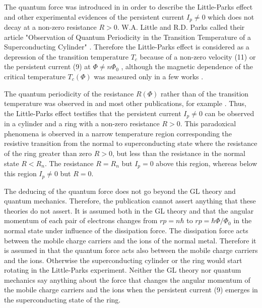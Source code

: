 \documentclass[twocolumn,secnumarabic,amssymb, nobibnotes, aps, prd]{revtex4}
\begin{document}
The quantum force was introduced in \cite{PRB2001} in order to describe the Little-Parks effect and other experimental evidences of the persistent current $I_{p} \neq 0$ which does not decay at a non-zero resistance $R > 0$. W.A. Little and R.D. Parks called their article "Observation of Quantum Periodicity in the Transition Temperature of a Superconducting Cylinder" \cite{LP1962}. Therefore the Little-Parks effect is considered as a depression of the transition temperature $T_{c}$ because of a non-zero velocity (11) or the persistent current (9) at $\Phi \neq n\Phi_{0}$ \cite{Tink75}, although the magnetic dependence of the critical temperature $T_{c}(\Phi)$ was measured only in a few works \cite{Moshchalkov1992}. 

The quantum periodicity of the resistance $R(\Phi)$ rather than of the transition temperature was observed in \cite{LP1962} and most other publications, for example \cite{Letter2007}. Thus, the Little-Parks effect testifies that the persistent current $I_{p} \neq 0$ can be observed in a cylinder \cite{LP1962} and a ring \cite{Letter2007} with a non-zero resistance $R > 0$. This paradoxical phenomena is observed in a narrow temperature region corresponding the resistive transition from the normal to superconducting state where the resistance of the ring greater than zero $R > 0$, but less than the resistance in the normal state $R < R_{n}$. The resistance $R = R_{n}$ but $I_{p} = 0$ above this region, whereas below this region $I_{p} \neq 0$ but $R = 0$. 

The deducing of the quantum force \cite{PRB2001} does not go beyond the GL theory and quantum mechanics. Therefore, the publication \cite{PRB2001} cannot assert anything that these theories do not assert. It is assumed both in the GL theory and \cite{PRB2001} that the angular momentum of each pair of electrons changes from $rp = n\hbar $ to $rp =  \hbar \Phi /\Phi _{0}$ in the normal state under influence of the dissipation force. The dissipation force acts between the mobile charge carriers and the ions of the normal metal. Therefore it is assumed in \cite{PRB2001} that the quantum force acts also between the mobile charge carriers and the ions. Otherwise the superconducting cylinder \cite{LP1962} or the ring \cite{Letter2007} would start rotating in the Little-Parks experiment. Neither the GL theory nor quantum mechanics say anything about the force that changes the angular momentum of the mobile charge carriers and the ions when the persistent current (9) emerges in the superconducting state of the ring.      
\end{document}
